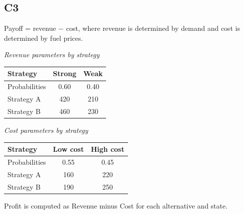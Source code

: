 		\subsection*{C3}
		Payoff = revenue $-$ cost, where revenue is determined by demand and cost is determined by fuel prices.
		\begin{center}
			\begin{minipage}[t]{0.48\linewidth}
				\textit{Revenue parameters by strategy}
				\begin{center}
					\begin{tabular}{l c c}
						\toprule
						Strategy & Strong & Weak \\
						\midrule
						Probabilities & 0.60 & 0.40 \\
						Strategy A & 420 & 210 \\
						Strategy B & 460 & 230 \\
						\bottomrule
					\end{tabular}
				\end{center}
			\end{minipage}
			\hfill
			\begin{minipage}[t]{0.48\linewidth}
				\textit{Cost parameters by strategy}
				\begin{center}
					\begin{tabular}{l c c}
						\toprule
						Strategy & Low cost & High cost \\
						\midrule
						Probabilities& 0.55 & 0.45 \\
						Strategy A & 160 & 220 \\
						Strategy B & 190 & 250 \\
						\bottomrule
					\end{tabular}
				\end{center}
			\end{minipage}
		\end{center}
		Profit is computed as Revenue minus Cost for each alternative and state.

